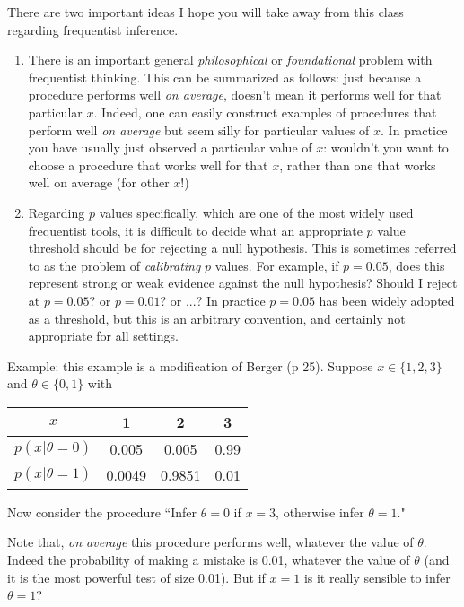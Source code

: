 \documentclass[times,11pt]{article}
\begin{document}
There are two important ideas I hope you will take away from this class regarding frequentist inference. 
\begin{enumerate}
\item There is an important general {\it philosophical} or {\it foundational} problem with frequentist thinking. This can be summarized as follows: just because
a procedure performs well {\it on average}, doesn't mean it performs well for that particular $x$.  Indeed,  one can easily construct examples of procedures that perform well {\it on average}
but seem silly for particular values of $x$.
In practice
you have usually just observed a particular value of $x$: wouldn't you want to choose a procedure that works well for that $x$, rather than one that works well on average (for other $x$!)
\item Regarding $p$ values specifically, which
are one of the most widely used frequentist tools,
it is difficult to decide what an appropriate $p$ value threshold should be for rejecting a null hypothesis. This is sometimes referred to as the problem of {\it calibrating} $p$ values. For example, if $p=0.05$, does this represent strong or weak evidence against the null hypothesis? Should I reject at $p=0.05$? or $p=0.01$? or ...?
In practice $p=0.05$ has been widely adopted as
a threshold, but this is an arbitrary convention, and certainly not appropriate for all settings.
\end{enumerate}


Example: this example is a modification of Berger (p 25). Suppose $x \in \{1,2,3\}$ and $\theta \in \{0,1\}$
with 
\begin{table}[h!]
\center
\begin{tabular}{c|c|c|c}
$x$ & 1 & 2 & 3 \\ \hline
$p(x|\theta=0)$ & 0.005 & 0.005 & 0.99 \\
$p(x|\theta=1)$ & 0.0049 & 0.9851 & 0.01 
\end{tabular}
\end{table}

Now consider the procedure ``Infer $\theta=0$ if $x=3$, otherwise infer $\theta=1$."

Note that, {\it on average} this procedure performs
well, whatever the value of $\theta$. Indeed
the probability of making a mistake is 0.01,
whatever the value of $\theta$ (and it is
the most powerful test of size 0.01). But
if $x=1$ is it really sensible to infer $\theta=1$?




\end{document}
